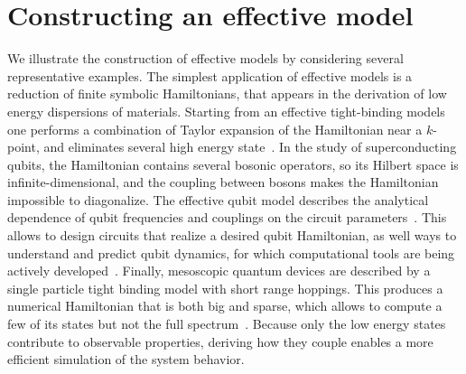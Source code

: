\section{Constructing an effective model}

We illustrate the construction of effective models by considering several
representative examples.
The simplest application of effective models is a reduction of finite symbolic
Hamiltonians, that appears in the derivation of low energy dispersions of materials.
Starting from an effective tight-binding models one performs a combination of
Taylor expansion of the Hamiltonian near a $k$-point, and eliminates several
high energy state~\cite{McCann_2013}.
In the study of superconducting qubits, the Hamiltonian contains
several bosonic operators, so its Hilbert space is infinite-dimensional, and
the coupling between bosons makes the Hamiltonian impossible to diagonalize.
The effective qubit model describes the analytical dependence of qubit frequencies and
couplings on the circuit parameters~\cite{Zhu_2013,Li_2020,Blais_2021,Sete_2021}.
This allows to design circuits that realize a desired qubit Hamiltonian, as
well ways to understand and predict qubit dynamics, for which computational
tools are being actively developed~\cite{Groszkowski_2021,Chitta_2022,Li_2022}.
Finally, mesoscopic quantum devices are described by a single particle tight
binding model with short range hoppings.
This produces a numerical Hamiltonian that is both big and sparse, which allows
to compute a few of its states but not the full spectrum~\cite{Melo_2023}.
Because only the low energy states contribute to observable properties,
deriving how they couple enables a more efficient simulation of the system
behavior.

